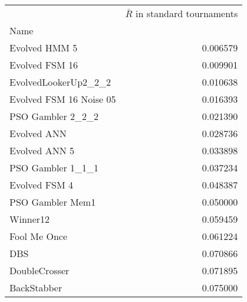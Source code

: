 \begin{tabular}{lr}
\toprule
{} &  $\bar{R}$ in standard tournaments \\
Name                    &                                    \\
\midrule
Evolved HMM 5           &                           0.006579 \\
Evolved FSM 16          &                           0.009901 \\
EvolvedLookerUp2\_2\_2    &                           0.010638 \\
Evolved FSM 16 Noise 05 &                           0.016393 \\
PSO Gambler 2\_2\_2       &                           0.021390 \\
Evolved ANN             &                           0.028736 \\
Evolved ANN 5           &                           0.033898 \\
PSO Gambler 1\_1\_1       &                           0.037234 \\
Evolved FSM 4           &                           0.048387 \\
PSO Gambler Mem1        &                           0.050000 \\
Winner12                &                           0.059459 \\
Fool Me Once            &                           0.061224 \\
DBS                     &                           0.070866 \\
DoubleCrosser           &                           0.071895 \\
BackStabber             &                           0.075000 \\
\bottomrule
\end{tabular}
